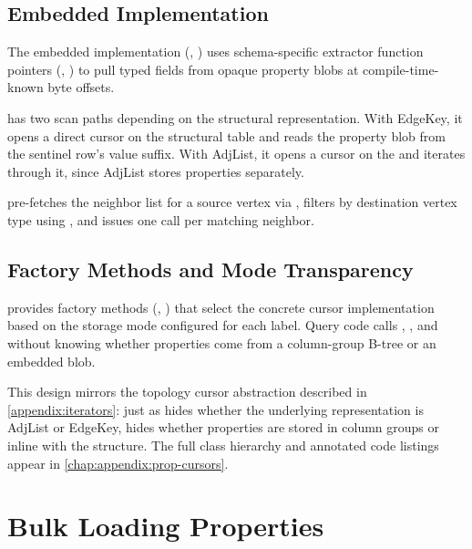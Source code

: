 \subsection{Embedded Implementation}
\label{arch:prop-cursors:embedded}

The embedded implementation (, ) uses schema-specific extractor function pointers (, ) to pull typed fields from opaque property blobs at compile-time-known byte offsets.

 has two scan paths depending on the structural representation.
With EdgeKey, it opens a direct \wt{} cursor on the structural table and reads the property blob from the sentinel row's value suffix.
With AdjList, it opens a cursor on the  and iterates through it, since AdjList stores properties separately.

 pre-fetches the neighbor list for a source vertex via , filters by destination vertex type using , and issues one  call per matching neighbor.

\subsection{Factory Methods and Mode Transparency}
\label{arch:prop-cursors:factory}

 provides factory methods (, ) that select the concrete cursor implementation based on the storage mode configured for each label.
Query code calls , , and  without knowing whether properties come from a column-group B-tree or an embedded blob.

This design mirrors the topology cursor abstraction described in \autoref{appendix:iterators}: just as  hides whether the underlying representation is AdjList or EdgeKey,  hides whether properties are stored in column groups or inline with the structure.
The full class hierarchy and annotated code listings appear in \autoref{chap:appendix:prop-cursors}.

\section{Bulk Loading Properties}
\label{arch:prop-bulk-load}

